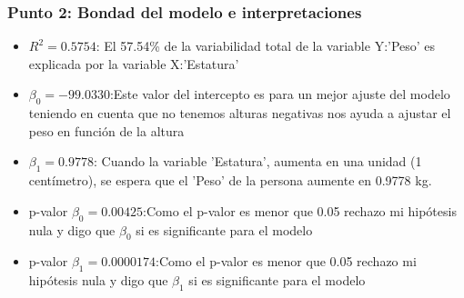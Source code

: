 \documentclass[12pt]{beamer}
\begin{document}
\begin{frame}
\frametitle{Punto 2: Bondad del modelo e interpretaciones}
\begin{itemize}
\item $R^2=0.5754$: El 57.54\% de la variabilidad total de la variable Y:'Peso' es explicada por la variable X:'Estatura'
\item $\beta_{0}=-99.0330$:Este valor del intercepto es para un mejor ajuste del modelo teniendo en cuenta que no tenemos alturas negativas nos ayuda a ajustar el peso en función de la altura
\item $\beta_{1}=0.9778$: Cuando la variable 'Estatura', aumenta en una unidad (1 centímetro), se espera que el 'Peso' de la persona aumente en 0.9778 kg.
\item p-valor $\beta_{0}=0.00425$:Como el p-valor es menor que 0.05 rechazo mi hipótesis nula y digo que $\beta_{0}$ si es significante para el modelo 
\item p-valor $\beta_{1}=0.0000174$:Como el p-valor es menor que 0.05 rechazo mi hipótesis nula y digo que $\beta_{1}$ si es significante para el modelo
\end{itemize}
\end{frame}
\end{document}
